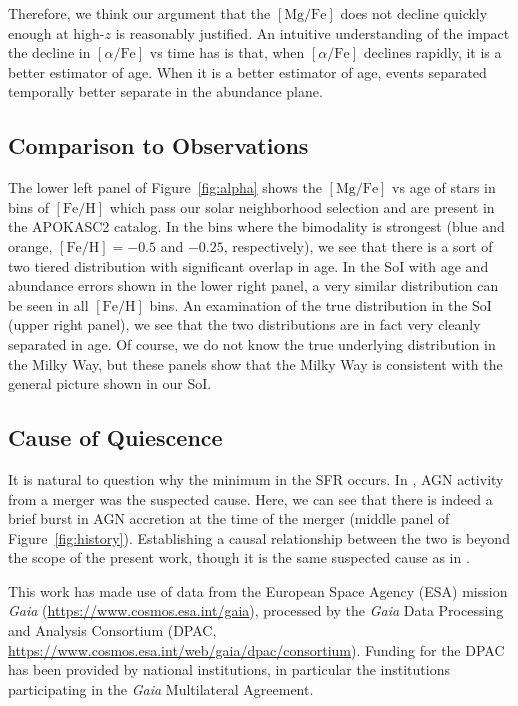 \documentclass[linenumbers, twocolumn]{aastex631}
\newcommand{\FeH}{\ensuremath{[\textrm{Fe}/\textrm{H}]}}
\newcommand{\MgFe}{\ensuremath{[\textrm{Mg}/\textrm{Fe}]}}
\newcommand{\alphaFe}{\ensuremath{[\alpha/\textrm{Fe}]}}
\begin{document}
Therefore, we think our argument that the \MgFe{} does not decline quickly enough at high-$z$ is reasonably justified. An intuitive understanding of the impact the decline in \alphaFe{} vs time has is that, when \alphaFe{} declines rapidly, it is a better estimator of age. When it is a better estimator of age, events separated temporally better separate in the abundance plane.

\subsection{Comparison to Observations}\label{ssec:compare_obs}
The lower left panel of Figure~\ref{fig:alpha} shows the \MgFe{} vs age of stars in bins of \FeH{} which pass our solar neighborhood selection and are present in the APOKASC2 catalog. In the bins where the bimodality is strongest (blue and orange, $\FeH=-0.5$ and $-0.25$, respectively), we see that there is a sort of two tiered distribution with significant overlap in age. In the SoI with age and abundance errors shown in the lower right panel, a very similar distribution can be seen in all \FeH{} bins. An examination of the true distribution in the SoI (upper right panel), we see that the two distributions are in fact very cleanly separated in age. Of course, we do not know the true underlying distribution in the Milky Way, but these panels show that the Milky Way is consistent with the general picture shown in our SoI.

\subsection{Cause of Quiescence}\label{ssec:cause_qui}
It is natural to question why the minimum in the SFR occurs. In \citet{2024arXiv240707985B}, AGN activity from a merger was the suspected cause. Here, we can see that there is indeed a brief burst in AGN accretion at the time of the merger (middle panel of Figure~\ref{fig:history}). Establishing a causal relationship between the two is beyond the scope of the present work, though it is the same suspected cause as in \citet{2024arXiv240707985B}.




\begin{acknowledgements}
This work has made use of data from the European Space Agency (ESA) mission {\it Gaia} (\url{https://www.cosmos.esa.int/gaia}), processed by the {\it Gaia} Data Processing and Analysis Consortium (DPAC, \url{https://www.cosmos.esa.int/web/gaia/dpac/consortium}). Funding for the DPAC has been provided by national institutions, in particular the institutions participating in the {\it Gaia} Multilateral Agreement.
\end{acknowledgements}

{}


% 
\end{document}
